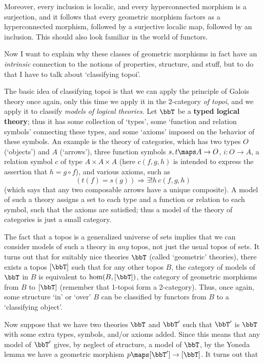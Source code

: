 \documentclass[12pt]{amsart}
\begin{document}
Moreover, every inclusion is localic, and every hyperconnected
morphism is a surjection, and it follows that every geometric morphism
factors as a hyperconnected morphism, followed by a surjective localic
map, followed by an inclusion.  This should also look familiar in the
world of functors.

Now I want to explain why these classes of geometric morphisms in fact
have an \emph{intrinsic} connection to the notions of properties,
structure, and stuff, but to do that I have to talk about
`classifying topoi'.

The basic idea of classifying topoi is that we can apply the principle
of Galois theory once again, only this time we apply it in the
2-category \emph{of topoi}, and we apply it to classify \emph{models
of logical theories}.  Let $\bbT$ be a \textbf{typed logical
theory}; thus it has some collection of `types', some `function and
relation symbols' connecting these types, and some `axioms' imposed on
the behavior of these symbols.  An example is the theory of
categories, which has two types $O$ (`objects') and $A$ (`arrows'),
three function symbols $s,t\maps A\to O$, $i:O\to A$, a relation
symbol $c$ of type $A\times A \times A$ (here $c(f,g,h)$ is intended
to express the assertion that $h=g\circ f$), and various axioms, such
as
\[(t(f) = s(g)) \Rightarrow \exists! h \, c(f,g,h)\] 
(which says that any
two composable arrows have a unique composite).  A model of such a
theory assigns a set to each type and a function or relation to each
symbol, such that the axioms are satisfied; thus a model of the theory
of categories is just a small category.

The fact that a topos is a generalized universe of sets implies that
we can consider models of such a theory in \emph{any} topos, not just
the usual topos of sets.  It turns out that for suitably nice theories
$\bbT$ (called `geometric' theories), there exists a topos $[\bbT]$
such that for any other topos $B$, the category of models of $\bbT$ in
$B$ is equivalent to $\hom(B,[\bbT])$, the category of geometric
morphisms from $B$ to $[\bbT]$ (remember that 1-topoi form a 2-category).
Thus, once again, some structure `in' or `over' $B$ can be classified
by functors from $B$ to a `classifying object'.

Now suppose that we have two theories $\bbT$ and $\bbT'$ such that
$\bbT'$ is $\bbT$ with some extra types, symbols, and/or axioms added.
Since this means that any model of $\bbT'$ gives, by neglect of
structure, a model of $\bbT$, by the Yoneda lemma we have a geometric
morphism $p\maps [\bbT']\to{} [\bbT]$.  It turns out that
\end{document}
